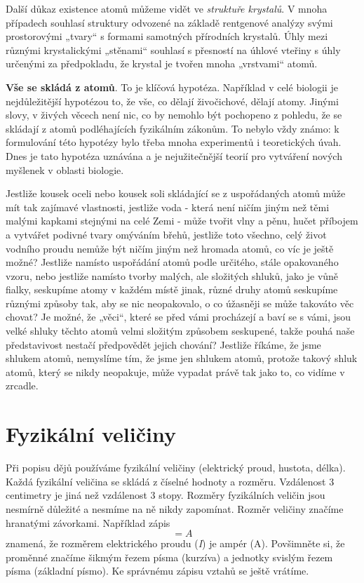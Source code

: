     Další důkaz existence atomů můžeme vidět ve \emph{struktuře krystalů}. V mnoha případech
    souhlasí struktury odvozené na základě rentgenové analýzy svými prostorovými „tvary“ s formami
    samotných přírodních krystalů. Úhly mezi různými krystalickými „stěnami“ souhlasí s přesností na
    úhlové vteřiny s úhly určenými za předpokladu, že krystal je tvořen mnoha „vrstvami“ atomů.
    
    \textbf{Vše se skládá z atomů}. To je klíčová hypotéza. Například v celé biologii je
    nejdůležitější hypotézou to, že vše, co dělají živočichové, dělají atomy. Jinými slovy, v živých
    věcech není nic, co by nemohlo být pochopeno z pohledu, že se skládají z atomů podléhajících
    fyzikálním zákonům. To nebylo vždy známo: k formulování této hypotézy bylo třeba mnoha
    experimentů i teoretických úvah. Dnes je tato hypotéza uznávána a je nejužitečnější teorií pro
    vytváření nových myšlenek v oblasti biologie.
    
    Jestliže kousek oceli nebo kousek soli skládající se z uspořádaných atomů může mít tak zajímavé
    vlastnosti, jestliže voda - která není ničím jiným než těmi malými kapkami stejnými na celé Zemi
    - může tvořit vlny a pěnu, hučet příbojem a vytvářet podivné tvary omýváním břehů, jestliže toto
    všechno, celý život vodního proudu nemůže být ničím jiným než hromada atomů, co víc je ještě
    možné? Jestliže namísto uspořádání atomů podle určitého, stále opakovaného vzoru, nebo jestliže
    namísto tvorby malých, ale složitých shluků, jako je vůně fialky, seskupíme atomy v každém místě
    jinak, různé druhy atomů seskupíme různými způsoby tak, aby se nic neopakovalo, o co úžasněji se
    může takováto věc chovat? Je možné, že „věci“, které se před vámi procházejí a baví se s vámi,
    jsou velké shluky těchto atomů velmi složitým způsobem seskupené, takže pouhá naše představivost
    nestačí předpovědět jejich chování? Jestliže říkáme, že jsme shlukem atomů, nemyslíme tím, že
    jsme jen shlukem atomů, protože takový shluk atomů, který se nikdy neopakuje, může vypadat právě
    tak jako to, co vidíme v zrcadle.

  \section{Fyzikální veličiny}\label{fyz:IchapIsecIX}
    Při popisu dějů používáme fyzikální veličiny (elektrický proud, hustota, délka). Každá fyzikální
    veličina se skládá z číselné hodnoty a rozměru. Vzdálenost \num{3} centimetry je jiná než
    vzdálenost \num{3} stopy. Rozměry fyzikálních veličin jsou nesmírně důležité a nesmíme na ně
    nikdy zapomínat. Rozměr veličiny značíme hranatými závorkami. Například zápis 
    \begin{equation*}
      [I] = \si{A}
    \end{equation*}
    znamená, že rozměrem elektrického proudu (\emph{I}) je ampér (A). Povšimněte si, že proměnné
    značíme šikmým řezem písma (kurzíva) a jednotky svislým řezem písma (základní písmo). Ke
    správnému zápisu vztahů se ještě vrátíme. 

